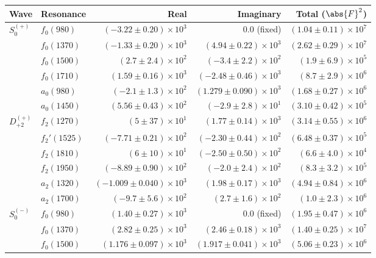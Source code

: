 \begin{table}[ht]
    \begin{center}
        \begin{tabular}{llrrr}\toprule
        Wave & Resonance & Real & Imaginary & Total ($\abs{F}^2$) \\\midrule
$S_{0}^{(+)}$ & $f_{0}(980)$ & $(-3.22 \pm 0.20) \times 10^{3}$ & $0.0$ (fixed) & $(1.04 \pm 0.11) \times 10^{7}$ \\
 & $f_{0}(1370)$ & $(-1.33 \pm 0.20) \times 10^{3}$ & $(4.94 \pm 0.22) \times 10^{3}$ & $(2.62 \pm 0.29) \times 10^{7}$ \\
 & $f_{0}(1500)$ & $(2.7 \pm 2.4) \times 10^{2}$ & $(-3.4 \pm 2.2) \times 10^{2}$ & $(1.9 \pm 6.9) \times 10^{5}$ \\
 & $f_{0}(1710)$ & $(1.59 \pm 0.16) \times 10^{3}$ & $(-2.48 \pm 0.46) \times 10^{3}$ & $(8.7 \pm 2.9) \times 10^{6}$ \\
 & $a_{0}(980)$ & $(-2.1 \pm 1.3) \times 10^{2}$ & $(1.279 \pm 0.090) \times 10^{3}$ & $(1.68 \pm 0.27) \times 10^{6}$ \\
 & $a_{0}(1450)$ & $(5.56 \pm 0.43) \times 10^{2}$ & $(-2.9 \pm 2.8) \times 10^{1}$ & $(3.10 \pm 0.42) \times 10^{5}$ \\
$D_{+2}^{(+)}$ & $f_{2}(1270)$ & $(5 \pm 37) \times 10^{1}$ & $(1.77 \pm 0.14) \times 10^{3}$ & $(3.14 \pm 0.55) \times 10^{6}$ \\
 & $f_{2}'(1525)$ & $(-7.71 \pm 0.21) \times 10^{2}$ & $(-2.30 \pm 0.44) \times 10^{2}$ & $(6.48 \pm 0.37) \times 10^{5}$ \\
 & $f_{2}(1810)$ & $(6 \pm 10) \times 10^{1}$ & $(-2.50 \pm 0.50) \times 10^{2}$ & $(6.6 \pm 4.0) \times 10^{4}$ \\
 & $f_{2}(1950)$ & $(-8.89 \pm 0.90) \times 10^{2}$ & $(-2.0 \pm 2.4) \times 10^{2}$ & $(8.3 \pm 3.2) \times 10^{5}$ \\
 & $a_{2}(1320)$ & $(-1.009 \pm 0.040) \times 10^{3}$ & $(1.98 \pm 0.17) \times 10^{3}$ & $(4.94 \pm 0.84) \times 10^{6}$ \\
 & $a_{2}(1700)$ & $(-9.7 \pm 5.6) \times 10^{2}$ & $(2.7 \pm 1.6) \times 10^{2}$ & $(1.0 \pm 2.3) \times 10^{6}$ \\
$S_{0}^{(-)}$ & $f_{0}(980)$ & $(1.40 \pm 0.27) \times 10^{3}$ & $0.0$ (fixed) & $(1.95 \pm 0.47) \times 10^{6}$ \\
 & $f_{0}(1370)$ & $(2.82 \pm 0.25) \times 10^{3}$ & $(2.46 \pm 0.18) \times 10^{3}$ & $(1.40 \pm 0.25) \times 10^{7}$ \\
 & $f_{0}(1500)$ & $(1.176 \pm 0.097) \times 10^{3}$ & $(1.917 \pm 0.041) \times 10^{3}$ & $(5.06 \pm 0.23) \times 10^{6}$ \\

\end{tabular}
\end{center}
\end{table}
